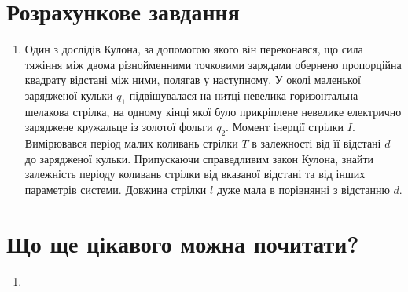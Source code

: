 \documentclass{LabWork}
\begin{document}
\section*{Розрахункове завдання}

\begin{enumerate}
\item Один з дослідів Кулона, за допомогою якого він переконався, що сила тяжіння між двома різнойменними
точковими зарядами обернено пропорційна квадрату відстані між ними, полягав у наступному. У околі маленької зарядженої кульки $q_1$ підвішувалася на нитці невелика горизонтальна шелакова стрілка, на одному кінці якої було прикріплене невелике електрично заряджене кружальце із золотої фольги $q_2$. Момент інерції стрілки $I$. Вимірювався період малих коливань стрілки $T$ в залежності від її відстані $d$ до зарядженої кульки. Припускаючи справедливим закон Кулона, знайти залежність періоду коливань стрілки від вказаної відстані та від інших параметрів системи. Довжина стрілки $l$ дуже мала в порівнянні з відстанню $d$.
\end{enumerate}

\section*{Що ще цікавого можна почитати?}

\begin{enumerate}
\item {} 
\end{enumerate}
\end{document}

